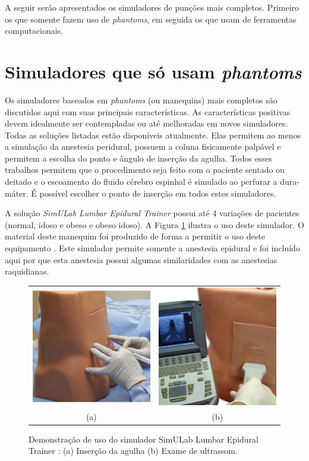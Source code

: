 A seguir serão apresentados os simuladores de punções mais completos. Primeiro os que somente fazem uso de \textit{phantoms}, em seguida os que usam de ferramentas computacionais.  

\section{Simuladores que só usam \textit{phantoms}} \label{sec:SimuladoresPhantoms}

Os simuladores baseados em \textit{phantoms} (ou manequins) mais completos são discutidos aqui com suas principais características. As características positivas devem idealmente ser contempladas ou até melhoradas em novos simuladores. Todas as soluções listadas estão disponíveis atualmente. Elas permitem ao menos a simulação da anestesia peridural, possuem a coluna fisicamente palpável e permitem a escolha do ponto e ângulo de inserção da agulha. Todos esses trabalhos permitem que o procedimento seja feito com o paciente sentado ou deitado e o escoamento do fluido cérebro espinhal é simulado ao perfurar a dura-máter. É possível escolher o ponto de inserção em todos estes simuladores.

A solução \textit{SimULab Lumbar Epidural Trainer} possui até 4 variações de pacientes (normal, idoso e obeso e obeso idoso). A Figura \ref{fig:simuladorSimulab} ilustra o uso deste simulador. O material deste manequim foi produzido de forma a permitir o uso deste equipamento \cite{SimulabCorporation2008}. Este simulador permite somente a anestesia epidural e foi incluído aqui por que esta anestesia possui algumas similaridades com as anestesias raquidianas. 

\begin{figure}[ht!]
    \centering
        \begin{tabular}{cc}
        \includegraphics[width=0.3\linewidth]{capitulos/figuras/simulab-insercao-agulha.jpg} & 
        \includegraphics[width=0.3\linewidth]{capitulos/figuras/simulab-ultrassom.jpg} 
        \\
        (a) & (b)
        \end{tabular}
    \caption{Demonstração de uso do simulador SimULab Lumbar Epidural Trainer \cite{SimulabCorporation2008}: (a) Inserção da agulha (b) Exame de ultrassom.}
    \label{fig:simuladorSimulab}
\end{figure}

